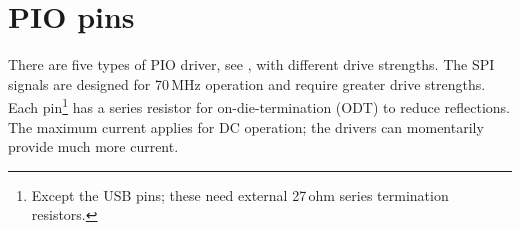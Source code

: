 \chapter{PIO pins}
\label{PIO pins}



There are five types of PIO driver, see , with
different drive strengths.  The SPI signals are designed for 70\,MHz
operation and require greater drive strengths.  Each
pin\footnote{Except the USB pins; these need external 27\,ohm series
  termination resistors.} has a series resistor for on-die-termination
(ODT) to reduce reflections.  The maximum current applies for DC
operation; the drivers can momentarily provide much more current.



